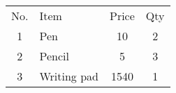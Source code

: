 \documentclass{article}
\begin{document}
	
	\begin{tabular}{cp{2cm}cc}
		No. & Item & Price & Qty\\
		1 & Pen & 10 & 2\\
		2 & Pencil & 5 & 3\\
		3 & Writing pad & 1540 & 1 \\
	\end{tabular}
\end{document}
